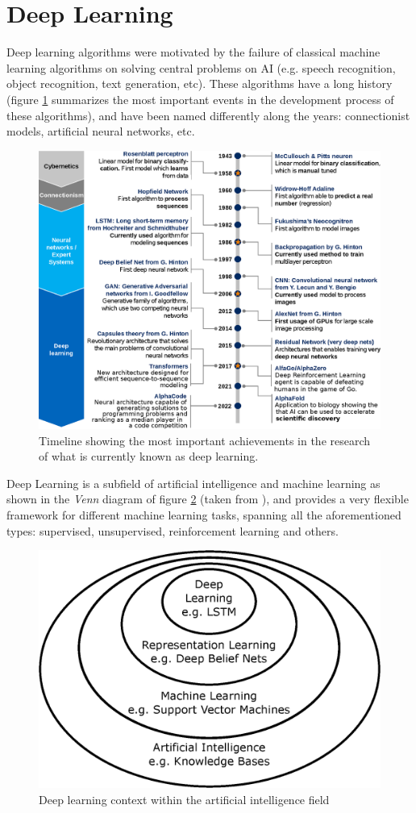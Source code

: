 \section{Deep Learning}

Deep learning algorithms were motivated by the failure of classical machine learning algorithms on solving central problems on AI (e.g. speech recognition, object recognition, text generation, etc). These algorithms have a long history (figure \ref{fig:dl-timeline} summarizes the most important events in the development process of these algorithms), and have been named differently along the years: connectionist models, artificial neural networks, etc.

\begin{figure}
	\centering
	\includegraphics[width=1.0\linewidth]{chapter2/images/DL-timeline}
	\caption{Timeline showing the most important achievements in the research of what is currently known as deep learning.}
	\label{fig:dl-timeline}
\end{figure}


Deep Learning is a subfield of artificial intelligence and machine learning as shown in the \textit{Venn} diagram of figure \ref{fig:venndl} (taken from \autocite{Goodfellow2016}), and provides a very flexible framework for different machine learning tasks, spanning all the aforementioned types: supervised, unsupervised, reinforcement learning and others.

\begin{figure}
	\centering
	\includegraphics[width=0.5\linewidth]{chapter2/images/venn_DL}
	\caption{Deep learning context within the artificial intelligence field \autocite{Goodfellow2016}}
	\label{fig:venndl}
\end{figure}



